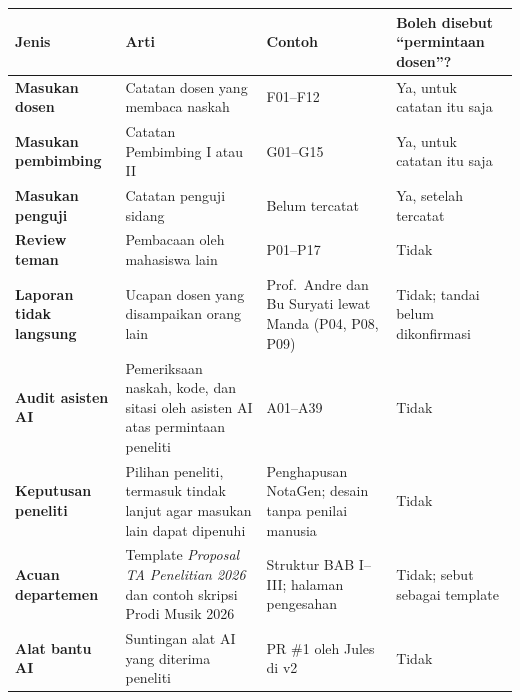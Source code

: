 \documentclass[a4paper,10pt]{article}
\begin{document}
\begin{tabularx}{\linewidth}{L{4.2cm} Y L{5.4cm} L{5.4cm}}
\toprule
\textbf{Jenis} & \textbf{Arti} & \textbf{Contoh} & \textbf{Boleh disebut ``permintaan dosen''?} \\
\midrule
\textcolor{dosen}{\textbf{Masukan dosen}} & Catatan dosen yang membaca naskah & F01--F12 & Ya, untuk catatan itu saja \\
\textcolor{pembimbing}{\textbf{Masukan pembimbing}} & Catatan Pembimbing I atau II & G01--G15 & Ya, untuk catatan itu saja \\
\textbf{Masukan penguji} & Catatan penguji sidang & Belum tercatat & Ya, setelah tercatat \\
\textcolor{teman}{\textbf{Review teman}} & Pembacaan oleh mahasiswa lain & P01--P17 & Tidak \\
\textcolor{tidaktercatat}{\textbf{Laporan tidak langsung}} & Ucapan dosen yang disampaikan orang lain & Prof.\ Andre dan Bu Suryati lewat Manda (P04, P08, P09) & Tidak; tandai belum dikonfirmasi \\
\textcolor{audit}{\textbf{Audit asisten AI}} & Pemeriksaan naskah, kode, dan sitasi oleh asisten AI atas permintaan peneliti & A01--A39 & Tidak \\
\textcolor{peneliti}{\textbf{Keputusan peneliti}} & Pilihan peneliti, termasuk tindak lanjut agar masukan lain dapat dipenuhi & Penghapusan NotaGen; desain tanpa penilai manusia & Tidak \\
\textcolor{tidaktercatat}{\textbf{Acuan departemen}} & Template \textit{Proposal TA Penelitian 2026} dan contoh skripsi Prodi Musik 2026 & Struktur BAB I--III; halaman pengesahan & Tidak; sebut sebagai template \\
\textcolor{alat}{\textbf{Alat bantu AI}} & Suntingan alat AI yang diterima peneliti & PR \#1 oleh Jules di v2 & Tidak \\
\bottomrule
\end{tabularx}
\end{document}
